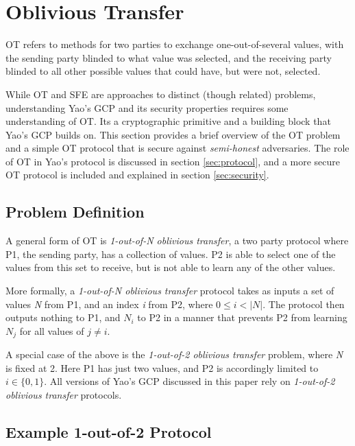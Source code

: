 \section{Oblivious Transfer}
\label{sec:ot}

\ac{OT} refers to methods for two parties to exchange one-out-of-several values, with the sending party blinded to what value was selected, and the receiving party blinded to all other possible values that could have, but were not, selected.

While \ac{OT} and \ac{SFE} are approaches to distinct (though related) problems, understanding Yao's \ac{GCP} and its security properties requires some understanding of \ac{OT}. Its a cryptographic primitive and a building block that Yao's \ac{GCP} builds on.  This section provides a brief overview of the \ac{OT} problem and a simple \ac{OT} protocol that is secure against \emph{semi-honest} adversaries. The role of \ac{OT} in Yao's protocol is discussed in section \ref{sec:protocol}, and a more secure \ac{OT} protocol is included and explained in section \ref{sec:security}.

\subsection{Problem Definition}

A general form of \ac{OT} is \emph{1-out-of-N oblivious transfer}, a two party protocol where \ac{P1}, the sending party, has a collection of values. \ac{P2} is able to select one of the values from this set to receive, but is not able to learn any of the other values.

More formally, a \emph{1-out-of-N oblivious transfer} protocol takes as inputs a set of values \emph{N} from \ac{P1}, and an index \emph{i} from \ac{P2}, where
$0 \leq i < |N|$. The protocol then outputs nothing to \ac{P1}, and $N_i$ to \ac{P2} in a manner that prevents \ac{P2} from learning $N_j$ for all values of $j \neq i$.

A special case of the above is the \emph{1-out-of-2 oblivious transfer} problem, where \emph{N} is fixed at 2.  Here \ac{P1} has just two values, and \ac{P2} is accordingly limited to $i \in \{0, 1\}$.  All versions of Yao's \ac{GCP} discussed in this paper rely on \emph{1-out-of-2 oblivious transfer} protocols.

\subsection{Example 1-out-of-2 Protocol}

